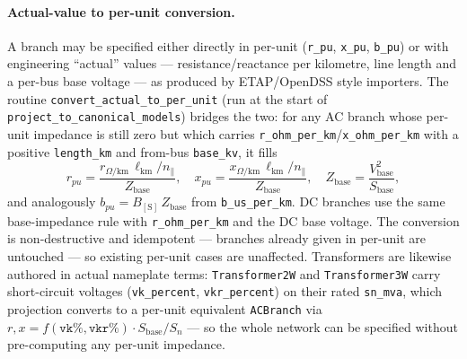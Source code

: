 \paragraph{Actual-value to per-unit conversion.}
A branch may be specified either directly in per-unit (\texttt{r\_pu}, \texttt{x\_pu},
\texttt{b\_pu}) or with engineering ``actual'' values --- resistance/reactance per
kilometre, line length and a per-bus base voltage --- as produced by ETAP/OpenDSS
style importers.  The routine \texttt{convert\_actual\_to\_per\_unit} (run at the
start of \texttt{project\_to\_canonical\_models}) bridges the two: for any AC branch
whose per-unit impedance is still zero but which carries
\texttt{r\_ohm\_per\_km}/\texttt{x\_ohm\_per\_km} with a positive \texttt{length\_km}
and from-bus \texttt{base\_kv}, it fills
\[
  r_{pu} = \frac{r_{\Omega/\mathrm{km}}\,\ell_{\mathrm{km}}/n_\parallel}{Z_\text{base}},\quad
  x_{pu} = \frac{x_{\Omega/\mathrm{km}}\,\ell_{\mathrm{km}}/n_\parallel}{Z_\text{base}},\quad
  Z_\text{base} = \frac{V_\text{base}^2}{S_\text{base}},
\]
and analogously \(b_{pu}=B_{[\mathrm S]}\,Z_\text{base}\) from \texttt{b\_us\_per\_km}.
DC branches use the same base-impedance rule with \texttt{r\_ohm\_per\_km} and the DC
base voltage.  The conversion is non-destructive and idempotent --- branches already
given in per-unit are untouched --- so existing per-unit cases are unaffected.
Transformers are likewise authored in actual nameplate terms: \texttt{Transformer2W}
and \texttt{Transformer3W} carry short-circuit voltages (\texttt{vk\_percent},
\texttt{vkr\_percent}) on their rated \texttt{sn\_mva}, which projection converts to a
per-unit equivalent \texttt{ACBranch} via
\(r,x = f(\texttt{vk\%},\texttt{vkr\%})\cdot S_\text{base}/S_n\) --- so the whole
network can be specified without pre-computing any per-unit impedance.

